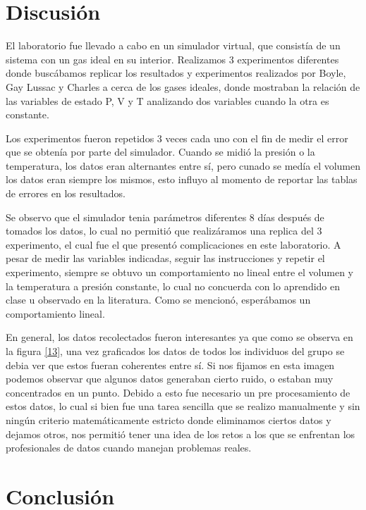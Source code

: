 \documentclass[journal,transmag]{IEEEtran}
\begin{document}
\section{Discusión}

El laboratorio fue llevado a cabo en un simulador virtual, que consistía de un sistema con un gas ideal en su interior. Realizamos 3 experimentos diferentes donde buscábamos replicar los resultados y experimentos realizados por Boyle, Gay Lussac y Charles a cerca de los gases ideales, donde mostraban la relación de las variables de estado P, V y T analizando dos variables cuando la otra es constante.


Los experimentos fueron repetidos 3 veces cada uno con el fin de
medir el error que se obtenía por parte del simulador. Cuando se midió la presión o la temperatura, los datos eran alternantes entre sí, pero cunado se medía el volumen los datos eran siempre los mismos, esto influyo al momento de reportar las tablas de errores en los resultados.


Se observo que el simulador tenia parámetros diferentes 8 días después de tomados los datos, lo cual no permitió que realizáramos una replica del 3 experimento, el cual fue el que presentó complicaciones en este laboratorio. A pesar de medir las variables indicadas, seguir las instrucciones y repetir el experimento, siempre se obtuvo un comportamiento no lineal entre el volumen y la temperatura a presión constante, lo cual no concuerda con lo aprendido en clase u observado en la literatura. Como se mencionó, esperábamos un comportamiento lineal. 

En general, los datos recolectados fueron interesantes ya que como se observa en la figura \ref{13}, una vez graficados los datos de todos los individuos del grupo se debia ver que estos fueran coherentes entre sí. Si nos fijamos en esta imagen podemos observar que algunos datos generaban cierto ruido, o estaban muy concentrados en un punto. Debido a esto fue necesario un pre procesamiento de estos datos, lo cual si bien fue una tarea sencilla que se realizo manualmente y sin ningún criterio matemáticamente estricto donde eliminamos ciertos datos y dejamos otros, nos permitió tener una idea de los retos a los que se enfrentan los profesionales de datos cuando manejan problemas reales. 
\section{Conclusión}
	
\end{document}
